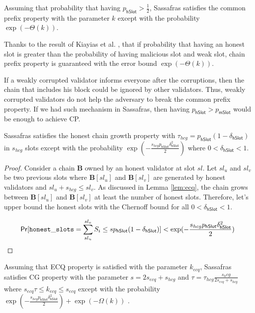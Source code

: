 \begin{lemma}[CP]
	Assuming that probability that having  $ p_{\mathsf{hSlot}} >\frac{1}{2}$, Sassafras satisfies the common prefix property  with the parameter $ k $ except with the probability  $ \exp(-\Theta(k)) $. 
\end{lemma}

Thanks to the result of  Kiayias et al. \cite{consistency}, that if probability that having an honest slot is greater than the probability of having malicious slot and weak slot, chain prefix property is guaranteed with the error bound $ \exp(-\Theta(k)) $.

If a weakly corrupted validator informs everyone after the corruptions, then the chain that includes his block could be ignored by other validators. Thus, weakly corrupted validators do not help the adversary to break the common prefix property. If we had such mechanism in Sassafras, then having $ p_{\mathsf{hSlot}}  > p_{\mathsf{mSlot}} $ would be enough to achieve CP. 


\begin{lemma}[HCG]
	Sassafras satisfies the honest chain growth property with $ \tau_{hcg} = p_{\mathsf{hSlot}}(1-\delta_{\mathsf{hSlot}})  $ in $ s_{hcg} $ slots except with the probability $ \exp(-\frac{s_{hcg}p_{\mathsf{hSlot}}\delta_{\mathsf{hSlot}}^2}{2}) $ where $ 0< \delta_{\mathsf{hSlot}} < 1 $.
\end{lemma}

\begin{proof}
	Consider a chain $ \mathbf{B} $ owned by an honest validator at slot $ sl $. Let $ sl_u $ and $ sl_v $ be two previous slots where $ \mathbf{B}[sl_u] $ and $ \mathbf{B}[sl_v] $ are generated by honest validators and $ sl_u + s_{hcg} \leq sl_v $. As discussed in  Lemma \ref{lem:ecq}, the chain grows between $ \mathbf{B}[sl_u] $ and $ \mathbf{B}[sl_v] $ at least the number of honest slots. Therefore, let's upper bound the honest slots with the Chernoff bound for all $ 0<\delta_{\mathsf{hSlot}}<1 $.
	
	\begin{equation}
	\mathsf{Pr}[\mathtt{honest\_slots} = \sum_{sl_u}^{sl_v}S_i \leq s p_{\mathsf{hSlot}}(1-\delta_{\mathsf{hSlot}})] < \exp(-\frac{s_{hcg}p_{\mathsf{hSlot}}\delta_{\mathsf{hSlot}}^2}{2})
	\end{equation}
	
	
\end{proof}


\begin{lemma}[CG]
	Assuming that ECQ property is satisfied with the parameter $ k_{ecq}  $, Sassafras satisfies CG property with the parameter $ s = 2s_{ecq} + s_{hcg} $ and $ \tau =  \tau_{hcg} \frac{s_hcg}{2 s_{ecq} + s_{hcg}}   $ where $ s_{ecq} \tau  \leq k_{ecq} \leq s_{ecq} $ except with the probability $ \exp(-\frac{s_{hcg}p_{\mathsf{hSlot}}\delta_{\mathsf{hSlot}}^2}{2}) +  \exp(-\Omega(k)) $ .
\end{lemma}

